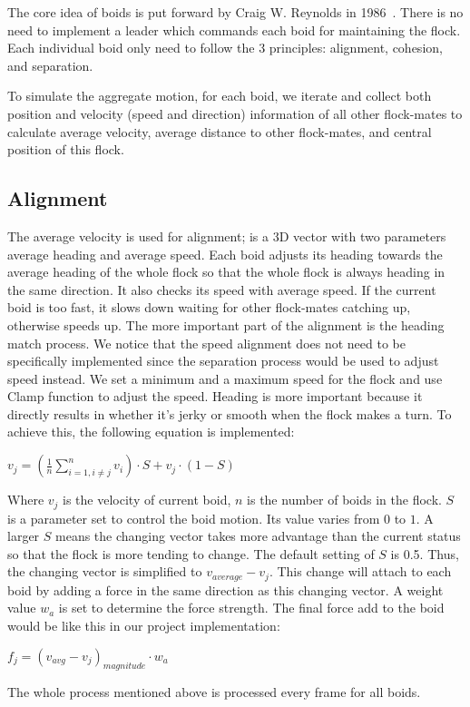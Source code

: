 The core idea of boids is put forward by Craig W. Reynolds in 1986~\cite{Reynolds:1987}. There is no need to implement a leader which commands each boid for maintaining the flock. Each individual boid only need to follow the 3 principles: alignment, cohesion, and separation.

To simulate the aggregate motion, for each boid, we iterate and collect both position and velocity (speed and direction) information of all other flock-mates to calculate average velocity, average distance to other flock-mates, and central position of this flock. 

\subsection{Alignment}
The average velocity is used for alignment; is a 3D vector with two parameters average heading and average speed. Each boid adjusts its heading towards the average heading of the whole flock so that the whole flock is always heading in the same direction. It also checks its speed with average speed. If the current boid is too fast, it slows down waiting for other flock-mates catching up, otherwise speeds up. The more important part of the alignment is the heading match process. We notice that the speed alignment does not need to be specifically implemented since the separation process would be used to adjust speed instead. We set a minimum and a maximum speed for the flock and use Clamp function to adjust the speed. Heading is more important because it directly results in whether it’s jerky or smooth when the flock makes a turn. To achieve this, the following equation is implemented:
\vspace{3mm}
\begin{center}
$v_j = (\frac{1}{n}\sum_{i=1,i\neq{j}}^{n}{v_i})\cdot S + v_j \cdot (1-S)$
\end{center}
\vspace{3mm}
Where $v_j$ is the velocity of current boid, $n$ is the number of boids in the flock. $S$ is a parameter set to control the boid motion. Its value varies from $0$ to $1$. A larger $S$ means the changing vector takes more advantage than the current status so that the flock is more tending to change. The default setting of $S$ is 0.5. Thus, the changing vector is simplified to $v_{average} - v_j$. This change will attach to each boid by adding a force in the same direction as this changing vector. A weight value $w_a$ is set to determine the force strength. The final force add to the boid would be like this in our project implementation:
\vspace{3mm}
\begin{center}
$f_j = (v_{avg} - v_j)_{magnitude} \cdot w_a$
\end{center}
\vspace{3mm}
The whole process mentioned above is processed every frame for all boids.
